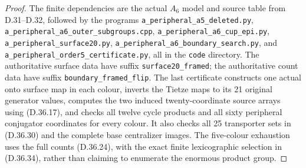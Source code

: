 \begin{proof}
The finite dependencies are the actual
\(A_6\) model and source table from D.31--D.32,
followed by the programs
\texttt{a\_peripheral\_a5\_deleted.py},
\texttt{a\_peripheral\_a6\_outer\_subgroups.cpp},
\texttt{a\_peripheral\_a6\_cup\_epi.py},
\texttt{a\_peripheral\_surface20.py},
\texttt{a\_peripheral\_a6\_boundary\_search.py},
and
\texttt{a\_peripheral\_order5\_certificate.py},
all in the \texttt{code} directory.
The authoritative surface data have suffix
\texttt{surface20\_framed}; the authoritative
count data have suffix
\texttt{boundary\_framed\_flip}.
The last certificate constructs one actual
onto surface map in each colour, inverts
the Tietze maps to its 21 original generator
values, computes the two induced
twenty-coordinate source arrays using
\textup{(D.36.17)}, and checks all twelve
cycle products and all sixty peripheral
conjugator coordinates for every colour.
It also checks all 25 transporter sets in
\textup{(D.36.30)} and the complete base
centralizer images.  The five-colour
exhaustion uses the full counts
\textup{(D.36.24)}, with the exact finite
lexicographic selection in
\textup{(D.36.34)}, rather than claiming
to enumerate the enormous product group.
\end{proof}
